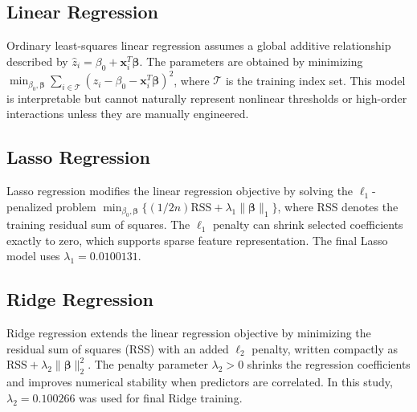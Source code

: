 \documentclass[conference]{IEEEtran}
\begin{document}
\subsection{Linear Regression}
Ordinary least-squares linear regression assumes a global additive relationship described by $\hat{z}_i = \beta_0+\mathbf{x}_i^T\boldsymbol{\beta}.$ The parameters are obtained by minimizing $\min_{\beta_0,\boldsymbol{\beta}}
    \sum_{i\in\mathcal{T}}
    \left(z_i-\beta_0-\mathbf{x}_i^T\boldsymbol{\beta}\right)^2$, where $\mathcal{T}$ is the training index set. This model is interpretable but cannot naturally represent nonlinear thresholds or high-order interactions unless they are manually engineered.

\subsection{Lasso Regression}
Lasso regression modifies the linear regression objective by solving the $\ell_1$-penalized problem $\min_{\beta_0,\boldsymbol{\beta}}\{(1/2n)\mathrm{RSS}+\lambda_1\|\boldsymbol{\beta}\|_1\}$, where RSS denotes the training residual sum of squares. The $\ell_1$ penalty can shrink selected coefficients exactly to zero, which supports sparse feature representation. The final Lasso model uses $\lambda_1=0.0100131$.

\subsection{Ridge Regression}
Ridge regression extends the linear regression objective by minimizing the residual sum of squares (RSS) with an added $\ell_2$ penalty, written compactly as $\mathrm{RSS}+\lambda_2\|\boldsymbol{\beta}\|_2^2$. The penalty parameter $\lambda_2>0$ shrinks the regression coefficients and improves numerical stability when predictors are correlated. In this study, $\lambda_2=0.100266$ was used for final Ridge training.
\end{document}
